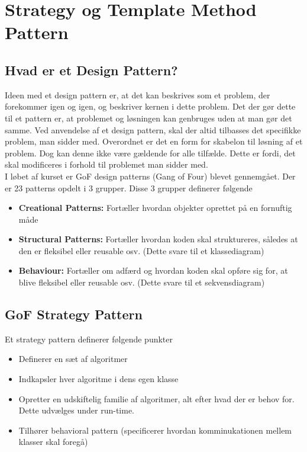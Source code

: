 \documentclass[../SWD_disp.tex]{subfiles}
\begin{document}
\section{Strategy og Template Method Pattern}

\subsection*{Hvad er et Design Pattern?}
Ideen med et design pattern er, at det kan beskrives som et problem, der forekommer igen og igen, og beskriver kernen i dette problem. Det der gør dette til et pattern er, at problemet og løsningen kan genbruges uden at man gør det samme. Ved anvendelse af et design pattern, skal der altid tilbasses det specifikke problem, man sidder med. Overordnet er det en form for skabelon til løsning af et problem. Dog kan denne ikke være gældende for alle tilfælde. Dette er fordi, det skal modificeres i forhold til problemet man sidder med.
\\

I løbet af kurset er GoF design patterns (Gang of Four) blevet gennemgået. Der er 23 patterns opdelt i 3 grupper. Disse 3 grupper definerer følgende

\begin{itemize}
	\item \textbf{Creational Patterns:} Fortæller hvordan objekter oprettet på en fornuftig måde
	\item \textbf{Structural Patterns:} Fortæller hvordan koden skal struktureres, således at den er fleksibel eller reusable osv. (Dette svare til et klassediagram)
	\item \textbf{Behaviour:} Fortæller om adfærd og hvordan koden skal opføre sig for, at blive fleksibel eller reusable osv. (Dette svare til et sekvensdiagram)
\end{itemize}
\subsection*{GoF Strategy Pattern}
Et strategy pattern definerer følgende punkter

\begin{itemize}
	\item Definerer en sæt af algoritmer
	\item Indkapsler hver algoritme i dens egen klasse
	\item Opretter en udskiftelig familie af algoritmer, alt efter hvad der er behov for. Dette udvælges under run-time.
	\item Tilhører behavioral pattern (specificerer hvordan komminukationen mellem klasser skal foregå)
\end{itemize}
\end{document}
